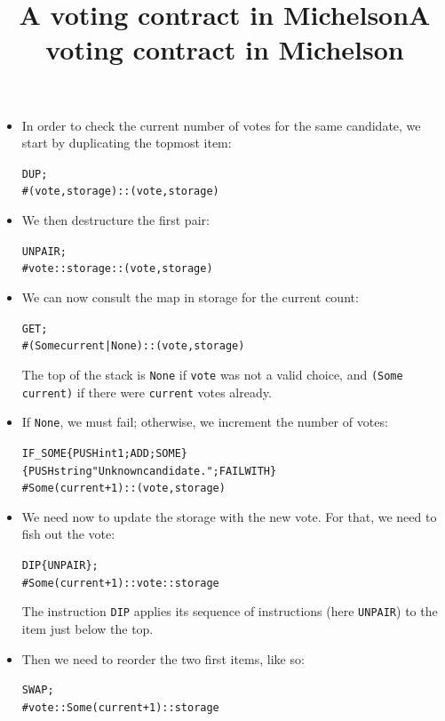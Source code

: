 \documentclass[wide]{slides}
\begin{document}
\begin{slide}
  \title{A voting contract in Michelson}

  \begin{itemize}

    \item In order to check the current number of votes for the same
      candidate, we start by duplicating the topmost item:
      \begin{alltt}
          DUP;
          # (vote, storage)::(vote, storage)
      \end{alltt}

    \item We then destructure the first pair:
      \begin{alltt}
          UNPAIR;
          # vote::storage::(vote, storage)
      \end{alltt}

    \item We can now consult the map in storage for the current count:
      \begin{alltt}
          GET;
          # (Some current | None)::(vote, storage)
      \end{alltt}
      The top of the stack is \texttt{None} if \texttt{vote} was not a
      valid choice, and \texttt{(Some current)} if there were
      \texttt{current} votes already.
  \end{itemize}

\end{slide}

\begin{slide}
  \title{A voting contract in Michelson}

  \begin{itemize}

    \item If \texttt{None}, we must fail; otherwise, we increment the
      number of votes:
      \begin{alltt}
          IF\_SOME \{ PUSH int 1; ADD; SOME \}
                   \{ PUSH string "Unknown candidate."; FAILWITH \}
          # Some (current+1) :: (vote, storage)
      \end{alltt}

    \item We need now to update the storage with the new vote. For
      that, we need to fish out the vote:
      \begin{alltt}
          DIP \{ UNPAIR \};
          # Some (current+1) :: vote :: storage
      \end{alltt}
      The instruction \texttt{DIP} applies its sequence of
      instructions (here \texttt{UNPAIR}) to the item just below the
      top.

    \item Then we need to reorder the two first items, like so:
      \begin{alltt}
          SWAP;
          # vote :: Some (current+1) :: storage
      \end{alltt}

  \end{itemize}

\end{slide}
\end{document}
